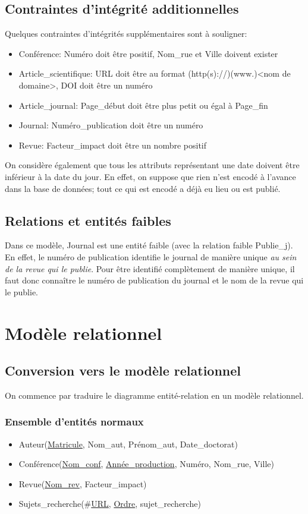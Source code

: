 \documentclass[a4paper, 12pt]{article}
\begin{document}
	\subsection{Contraintes d'intégrité additionnelles}
	Quelques contraintes d'intégrités supplémentaires sont à souligner:
	\begin{itemize}
		\item Conférence: Numéro doit être positif, Nom\_rue et Ville doivent exister
		\item Article\_scientifique: URL doit être au format \og (http(s)://)(www.)<nom de domaine>\fg{}, DOI doit être un numéro
		\item Article\_journal: Page\_début doit être plus petit ou égal à Page\_fin
		\item Journal: Numéro\_publication doit être un numéro
		\item Revue: Facteur\_impact doit être un nombre positif
	\end{itemize}
	On considère également que tous les attributs représentant une date doivent être inférieur à la date du jour. En effet, on suppose que rien n'est encodé à l'avance dans la base de données; tout ce qui est encodé a déjà eu lieu ou est publié.
	\subsection{Relations et entités faibles}
	Dans ce modèle, Journal est une entité faible (avec la relation faible Publie\_j). En effet, le numéro de publication identifie le journal de manière unique {\it au sein de la revue qui le publie}. Pour être identifié complètement de manière unique, il faut donc connaître le numéro de publication du journal et le nom de la revue qui le publie. 
	\section{Modèle relationnel}
	\subsection{Conversion vers le modèle relationnel}
	On commence par traduire le diagramme entité-relation en un modèle relationnel.
	\subsubsection{Ensemble d'entités \og normaux\fg{}}
	\begin{itemize}
		\item Auteur(\underline{Matricule}, Nom\_aut, Prénom\_aut, Date\_doctorat)
		\item Conférence(\underline{Nom\_conf}, \underline{Année\_production}, Numéro, Nom\_rue, Ville)
		\item Revue(\underline{Nom\_rev}, Facteur\_impact)
		\item Sujets\_recherche(\#\underline{URL}, \underline{Ordre}, sujet\_recherche)
	\end{itemize}
\end{document}
